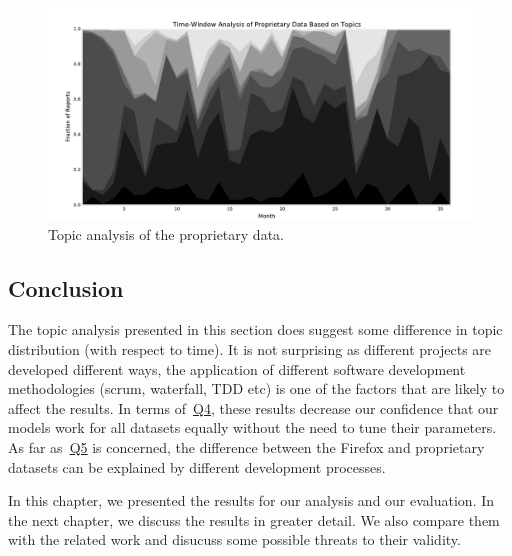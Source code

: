 \begin{figure}[htbp]
    \centering
        \includegraphics[width=\textwidth]{./images/topic_component_distribution/proprietary_topic_10.pdf}
    \caption{Topic analysis of the proprietary data.}
    \label{fig:distribution.prop.topic}
\end{figure}

\subsection{Conclusion}

The topic analysis presented in this section does suggest some difference in topic distribution (with respect to time). It is not surprising as different projects are developed different ways, the application of different software development methodologies (scrum, waterfall, TDD etc) is one of the factors that are likely to affect the results. In terms of~\hyperlink{question:4}{Q4}, these results decrease our confidence that our models work for all datasets equally without the need to tune their parameters. As far as~\hyperlink{question:5}{Q5} is concerned, the difference between the Firefox and proprietary datasets can be explained by different development processes.

In this chapter, we presented the results for our analysis and our evaluation. In the next chapter, we discuss the results in greater detail. We also compare them with the related work and disucuss some possible threats to their validity.
